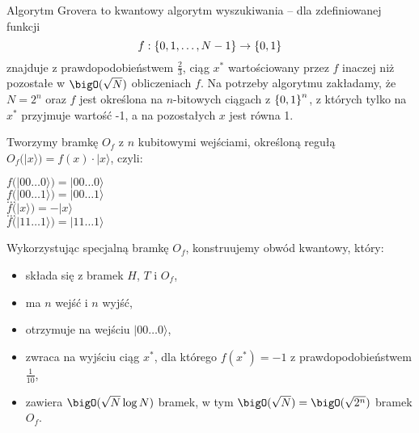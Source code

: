 
Algorytm Grovera to kwantowy algorytm wyszukiwania -- dla zdefiniowanej funkcji
\[
    f : \set{0, 1, \ldots, N - 1} \rightarrow \set{0, 1}
\]
znajduje z prawdopodobieństwem \( \frac{2}{3} \), ciąg \( x^{*} \) wartościowany przez \( f \) inaczej niż pozostałe w \( \bigO(\sqrt{N}) \) obliczeniach \( f \).
Na potrzeby algorytmu zakładamy, że \( N = 2^n \) oraz \( f \) jest określona na \( n \)-bitowych ciągach z \( \set{0, 1}^n \), z których tylko na \( x^{*} \) przyjmuje wartość -1, a na pozostałych \( x \) jest równa 1.

Tworzymy bramkę \( O_f \) z \( n \) kubitowymi wejściami, określoną regułą \( O_f (|x\rangle) = f(x) \cdot |x \rangle \), czyli:
\begin{center}
    \( f (|00\ldots0 \rangle) = |00\ldots0 \rangle \) \\
    \( f (|00\ldots1 \rangle) = |00\ldots1 \rangle \) \\
    \( \ldots \) \\
    \( f (|x \rangle) = -|x \rangle \) \\
    \( \ldots \) \\
    \( f (|11\ldots1 \rangle) = |11\ldots1 \rangle \)
\end{center}

Wykorzystując specjalną bramkę \( O_f \), konstruujemy obwód kwantowy, który:
\begin{itemize}
    \item składa się z bramek \( H \), \( T \) i \( O_f \),
    \item ma \( n \) wejść i \( n \) wyjść,
    \item otrzymuje na wejściu \( |00\ldots0 \rangle \),
    \item zwraca na wyjściu ciąg \( x^{*} \), dla którego \( f(x^{*}) = -1 \) z prawdopodobieństwem \( \frac{1}{10} \),
    \item zawiera \( \bigO(\sqrt{N} \log N) \) bramek, w tym \( \bigO(\sqrt{N}) = \bigO(\sqrt{2^n}) \) bramek \( O_f \).
\end{itemize}

